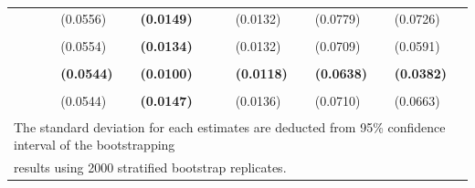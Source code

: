 \documentclass[
  12pt,
]{article}
\begin{document}
\begin{table}[H]
{\begin{tabular}[t]{llll>{}lllll}
 &  &  & (0.0556) & \textbf{(0.0149)} &  & (0.0132) & (0.0779) & (0.0726)\\
\addlinespace
\cellcolor{gray!6}{c.hamilton13.panel} & \cellcolor{gray!6}{-1.6294} & \cellcolor{gray!6}{-6.7027} & \cellcolor{gray!6}{0.5166} & \textbf{\cellcolor{gray!6}{0.5222}} & \cellcolor{gray!6}{-2.9398} & \cellcolor{gray!6}{0.7500} & \cellcolor{gray!6}{0.2778} & \cellcolor{gray!6}{0.6397}\\
 &  &  & (0.0554) & \textbf{(0.0134)} &  & (0.0132) & (0.0709) & (0.0591)\\
\addlinespace
\textbf{\cellcolor{gray!6}{BIS Basel gap}} & \textbf{\cellcolor{gray!6}{-0.7015}} & \textbf{\cellcolor{gray!6}{-5.7748}} & \textbf{\cellcolor{gray!6}{0.4928}} & \textbf{\textbf{\cellcolor{gray!6}{0.5217}}} & \textbf{\cellcolor{gray!6}{-5.3969}} & \textbf{\cellcolor{gray!6}{0.7920}} & \textbf{\cellcolor{gray!6}{0.1389}} & \textbf{\cellcolor{gray!6}{0.6465}}\\
\textbf{} & \textbf{} & \textbf{} & \textbf{(0.0544)} & \textbf{\textbf{(0.0100)}} & \textbf{} & \textbf{(0.0118)} & \textbf{(0.0638)} & \textbf{(0.0382)}\\
\addlinespace
\cellcolor{gray!6}{c.hamilton28.panelr20} & \cellcolor{gray!6}{-4.9986} & \cellcolor{gray!6}{-10.0719} & \cellcolor{gray!6}{0.5123} & \textbf{\cellcolor{gray!6}{0.5213}} & \cellcolor{gray!6}{-1.5578} & \cellcolor{gray!6}{0.6932} & \cellcolor{gray!6}{0.3333} & \cellcolor{gray!6}{0.5916}\\
 &  &  & (0.0544) & \textbf{(0.0147)} &  & (0.0136) & (0.0710) & (0.0663)\\
\bottomrule
\multicolumn{9}{l}{\textsuperscript{} The standard deviation for each estimates are deducted from 95\% confidence interval of the bootstrapping}\\
\multicolumn{9}{l}{results using 2000 stratified bootstrap replicates.}\\
\end{tabular}}
\end{table}
\end{document}

